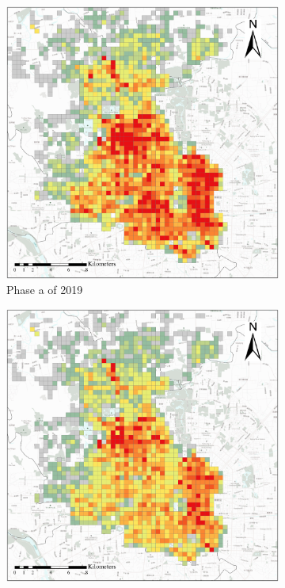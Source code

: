 \documentclass[preprints,ijgi,submit,moreauthors]{Definitions/mdpi}
\begin{document}
\begin{figure}[ht]
    \vspace{6pt}
    \begin{subfigure}{.28\textwidth}
        \includegraphics[width=\textwidth]{Figures/BSSPhase1_2019.eps}
        \caption{Phase a of 2019}\label{fig:p_a_2019}
    \end{subfigure}
    \begin{subfigure}{.28\textwidth}
        \includegraphics[width=\textwidth]{Figures/BSSPhase2_2019.eps}

\end{subfigure}
\end{figure}
\end{document}

